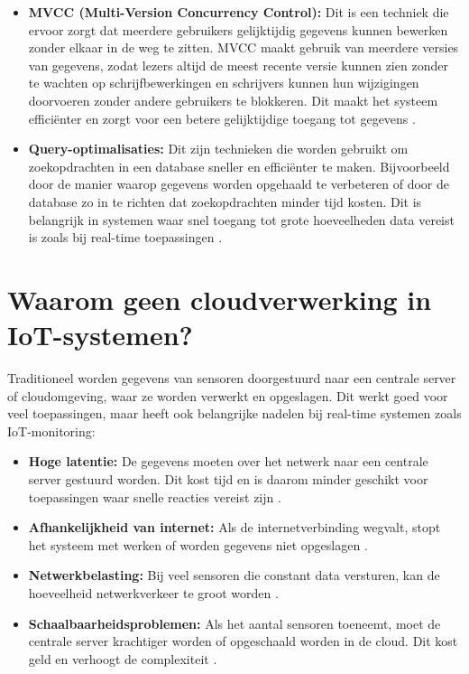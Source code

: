 \begin{itemize}
    \item \textbf{MVCC (Multi-Version Concurrency Control):} Dit is een techniek die ervoor zorgt dat meerdere gebruikers gelijktijdig gegevens kunnen bewerken zonder elkaar in de weg te zitten. MVCC maakt gebruik van meerdere versies van gegevens, zodat lezers altijd de meest recente versie kunnen zien zonder te wachten op schrijfbewerkingen en schrijvers kunnen hun wijzigingen doorvoeren zonder andere gebruikers te blokkeren. Dit maakt het systeem efficiënter en zorgt voor een betere gelijktijdige toegang tot gegevens \autocite{Wiseso2020PerformanceAnalysis}.

    \item \textbf{Query-optimalisaties:} Dit zijn technieken die worden gebruikt om zoekopdrachten in een database sneller en efficiënter te maken. Bijvoorbeeld door de manier waarop gegevens worden opgehaald te verbeteren of door de database zo in te richten dat zoekopdrachten minder tijd kosten. Dit is belangrijk in systemen waar snel toegang tot grote hoeveelheden data vereist is zoals bij real-time toepassingen \autocite{Gyorodi2015comparative}.
\end{itemize}

\section{Waarom geen cloudverwerking in IoT-systemen?}
\label{sec:problemen-cloud}

Traditioneel worden gegevens van sensoren doorgestuurd naar een centrale server of cloudomgeving, waar ze worden verwerkt en opgeslagen. Dit werkt goed voor veel toepassingen, maar heeft ook belangrijke nadelen bij real-time systemen zoals IoT-monitoring:

\begin{itemize}
    \item \textbf{Hoge latentie:} De gegevens moeten over het netwerk naar een centrale server gestuurd worden. Dit kost tijd en is daarom minder geschikt voor toepassingen waar snelle reacties vereist zijn \autocite{Shi2016}.
    \item \textbf{Afhankelijkheid van internet:} Als de internetverbinding wegvalt, stopt het systeem met werken of worden gegevens niet opgeslagen \autocite{Rahmani2018}.
    \item \textbf{Netwerkbelasting:} Bij veel sensoren die constant data versturen, kan de hoeveelheid netwerkverkeer te groot worden \autocite{Kleppmann2017}.
    \item \textbf{Schaalbaarheidsproblemen:} Als het aantal sensoren toeneemt, moet de centrale server krachtiger worden of opgeschaald worden in de cloud. Dit kost geld en verhoogt de complexiteit \autocite{Kleppmann2017}.
\end{itemize}

